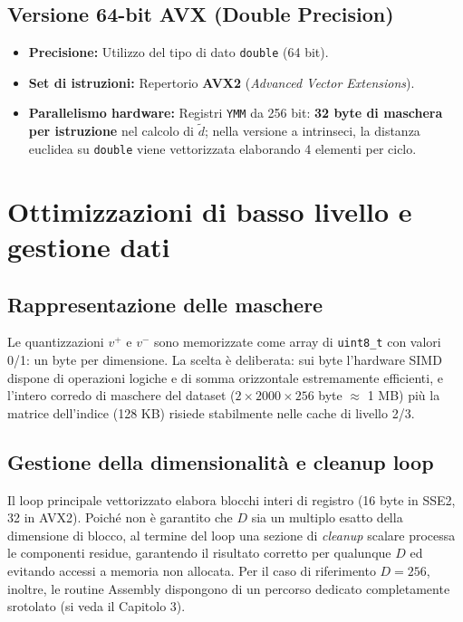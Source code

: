 \subsection{Versione 64-bit AVX (Double Precision)}
\begin{itemize}
    \item \textbf{Precisione:} Utilizzo del tipo di dato \texttt{double} (64 bit).
    \item \textbf{Set di istruzioni:} Repertorio \textbf{AVX2} (\textit{Advanced Vector Extensions}).
    \item \textbf{Parallelismo hardware:} Registri \texttt{YMM} da 256 bit: \textbf{32 byte di maschera per istruzione} nel calcolo di $\tilde{d}$; nella versione a intrinseci, la distanza euclidea su \texttt{double} viene vettorizzata elaborando 4 elementi per ciclo.
\end{itemize}

\section{Ottimizzazioni di basso livello e gestione dati}

\subsection{Rappresentazione delle maschere}
Le quantizzazioni $v^+$ e $v^-$ sono memorizzate come array di \texttt{uint8\_t} con valori 0/1: un byte per dimensione. La scelta è deliberata: sui byte l'hardware SIMD dispone di operazioni logiche e di somma orizzontale estremamente efficienti, e l'intero corredo di maschere del dataset ($2 \times 2000 \times 256$ byte $\approx$ 1 MB) più la matrice dell'indice (128 KB) risiede stabilmente nelle cache di livello 2/3.

\subsection{Gestione della dimensionalità e cleanup loop}
Il loop principale vettorizzato elabora blocchi interi di registro (16 byte in SSE2, 32 in AVX2). Poiché non è garantito che $D$ sia un multiplo esatto della dimensione di blocco, al termine del loop una sezione di \textit{cleanup} scalare processa le componenti residue, garantendo il risultato corretto per qualunque $D$ ed evitando accessi a memoria non allocata. Per il caso di riferimento $D=256$, inoltre, le routine Assembly dispongono di un percorso dedicato completamente srotolato (si veda il Capitolo 3).

